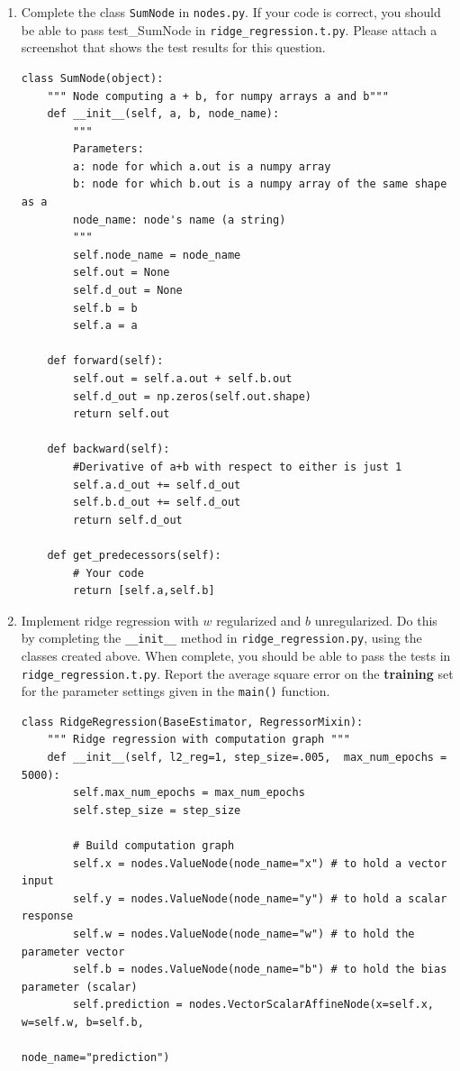\documentclass{article}
\theoremstyle{plain}
\theoremstyle{definition}
\begin{document}
\begin{enumerate}
\item Complete the class \texttt{SumNode} in \texttt{nodes.py}. If your code is correct, you should be able to pass test\_SumNode in \texttt{ridge\_regression.t.py}. Please attach a screenshot that shows the test results for this question. 

\subitem

\begin{verbatim}
class SumNode(object):
    """ Node computing a + b, for numpy arrays a and b"""
    def __init__(self, a, b, node_name):
        """ 
        Parameters:
        a: node for which a.out is a numpy array
        b: node for which b.out is a numpy array of the same shape as a
        node_name: node's name (a string)
        """
        self.node_name = node_name
        self.out = None
        self.d_out = None
        self.b = b
        self.a = a

    def forward(self):
        self.out = self.a.out + self.b.out
        self.d_out = np.zeros(self.out.shape)
        return self.out

    def backward(self):
        #Derivative of a+b with respect to either is just 1
        self.a.d_out += self.d_out
        self.b.d_out += self.d_out
        return self.d_out

    def get_predecessors(self):
        # Your code
        return [self.a,self.b]
\end{verbatim}

\item Implement ridge regression with $w$ regularized and $b$ unregularized. Do this by completing the \texttt{\_\_init\_\_} method in \texttt{ridge\_regression.py},
using the classes created above. When complete, you should be able
to pass the tests in \texttt{ridge\_regression.t.py}. Report the average
square error on the \textbf{training} set for the parameter settings
given in the \texttt{main()} function. 

\subitem
\newpage

\begin{verbatim}
class RidgeRegression(BaseEstimator, RegressorMixin):
    """ Ridge regression with computation graph """
    def __init__(self, l2_reg=1, step_size=.005,  max_num_epochs = 5000):
        self.max_num_epochs = max_num_epochs
        self.step_size = step_size

        # Build computation graph
        self.x = nodes.ValueNode(node_name="x") # to hold a vector input
        self.y = nodes.ValueNode(node_name="y") # to hold a scalar response
        self.w = nodes.ValueNode(node_name="w") # to hold the parameter vector
        self.b = nodes.ValueNode(node_name="b") # to hold the bias parameter (scalar)
        self.prediction = nodes.VectorScalarAffineNode(x=self.x, w=self.w, b=self.b,
                                                 node_name="prediction")


\end{verbatim}
\end{enumerate}
\end{document}
